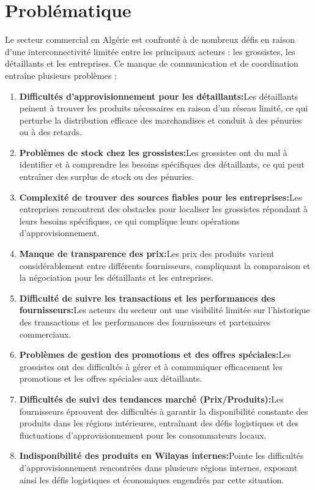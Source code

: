 \documentclass[edit,12pt,a4paper,ChapStyle,oneside,doubleinterligne]{report}
\begin{document}
\section{Problématique}
Le secteur commercial en Algérie est confronté à de nombreux défis en raison d'une interconnectivité limitée entre les principaux acteurs : les grossistes, les détaillants et les entreprises. Ce manque de communication et de coordination entraîne plusieurs problèmes :
\begin{enumerate}
    \item \textbf{Difficultés d'approvisionnement pour les détaillants:}Les détaillants peinent à trouver les produits nécessaires en raison d'un réseau limité, ce qui perturbe la distribution efficace des marchandises et conduit à des pénuries ou à des retards.
    \item \textbf{Problèmes de stock chez les grossistes:}Les grossistes ont du mal à identifier et à comprendre les besoins spécifiques des détaillants, ce qui peut entraîner des surplus de stock ou des pénuries.
    \item \textbf{Complexité de trouver des sources fiables pour les entreprises:}Les entreprises rencontrent des obstacles pour localiser les grossistes répondant à leurs besoins spécifiques, ce qui complique leurs opérations d'approvisionnement.
    \item \textbf{Manque de transparence des prix:}Les prix des produits varient considérablement entre différents fournisseurs, compliquant la comparaison et la négociation pour les détaillants et les entreprises.
    \item \textbf{Difficulté de suivre les transactions et les performances des fournisseurs:}Les acteurs du secteur ont une visibilité limitée sur l'historique des transactions et les performances des fournisseurs et partenaires commerciaux.
    \item \textbf{Problèmes de gestion des promotions et des offres spéciales:}Les grossistes ont des difficultés à gérer et à communiquer efficacement les promotions et les offres spéciales aux détaillants.
    \item \textbf{Difficultés de suivi des tendances marché (Prix/Produits):}Les fournisseurs éprouvent des difficultés à garantir la disponibilité constante des produits dans les régions intérieures, entraînant des défis logistiques et des fluctuations d'approvisionnement pour les consommateurs locaux.
    \item \textbf{Indisponibilité des produits en Wilayas internes:}Pointe les difficultés d'approvisionnement rencontrées dans plusieurs régions internes, exposant ainsi les défis logistiques et économiques engendrés par cette situation.
\end{enumerate}
\end{document}
